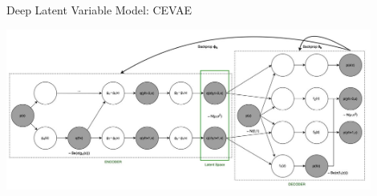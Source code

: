 \documentclass[10pt]{beamer}
\begin{document}
  \begin{frame}{Deep Latent Variable Model: CEVAE}
         
    \begin{center}
  \includegraphics[width=0.9\textwidth]{images/cevae_architecture.jpeg}
\end{center}

 \end{frame}
\end{document}
